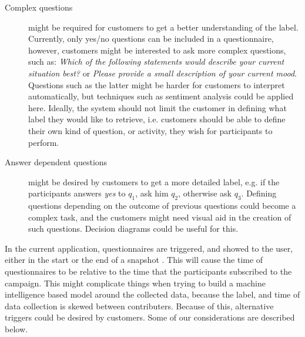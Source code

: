 \begin{description}
    \item[Complex questions] might be required for customers to get a better understanding of the label. Currently, only yes/no questions can be included in a questionnaire, however, customers might be interested to ask more complex questions, such as: \emph{Which of the following statements would describe your current situation best?} or \emph{Please provide a small description of your current mood}. Questions such as the latter might be harder for customers to interpret automatically, but techniques such as  sentiment analysis could be applied here. Ideally, the system should not limit the customer in defining what label they would like to retrieve, i.e. customers should be able to define their own kind of question, or activity, they wish for participants to perform.
    \item[Answer dependent questions] might be desired by customers to get a more detailed label, e.g. if the participants answers \emph{yes} to $q_1$, ask him $q_2$, otherwise ask $q_3$. Defining questions depending on the outcome of previous questions could become a complex task, and the customers might need visual aid in the creation of such questions. Decision diagrams could be useful for this.
\end{description}

In the current application, questionnaires are triggered, and showed to the user, either in the start or the end of a snapshot . This will cause the time of questionnaires to be relative to the time that the participants subscribed to the campaign. This might complicate things when trying to build a machine intelligence based model around the collected data, because the label, and time of data collection is skewed between contributers. Because of this, alternative triggers could be desired by customers. Some of our considerations are described below.

